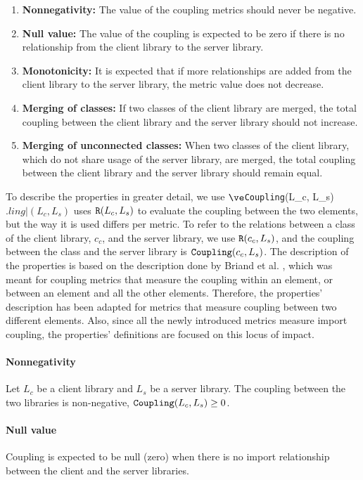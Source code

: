 \begin{enumerate}
  \item \textbf{Nonnegativity:} The value of the coupling metrics should never be negative.
  \item \textbf{Null value:} The value of the coupling is expected to be zero if there is no relationship from the client library to the server library.
  \item \textbf{Monotonicity:} It is expected that if more relationships are added from the client library to the server library, the metric value does not decrease.
  \item \textbf{Merging of classes:} If two classes of the client library are merged, the total coupling between the client library and the server library should not increase.
  \item \textbf{Merging of unconnected classes:} When two classes of the client library, which do not share usage of the server library, are merged, the total coupling between the client library and the server library should remain equal.
\end{enumerate}

To describe the properties in greater detail, we use $\ve$\verb|Coupling|(L_c, L_s)$.ling|(L_c, L_s)$ uses $\verb|R|(L_c, L_s)$ to evaluate the coupling between the two elements, but the way it is used differs per metric. To refer to the relations between a class of the client library, $c_c$, and the server library, we use $\verb|R|(c_c, L_s)$, and the coupling between the class and the server library is $\verb|Coupling|(c_c, L_s)$. The description of the properties is based on the description done by Briand et al. \cite{briand1996property}, which was meant for coupling metrics that measure the coupling within an element, or between an element and all the other elements. Therefore, the properties' description has been adapted for metrics that measure coupling between two different elements. Also, since all the newly introduced metrics measure import coupling, the properties' definitions are focused on this locus of impact.

\paragraph{Nonnegativity}

Let $L_c$ be a client library and $L_s$ be a server library. The coupling between the two libraries is non-negative, $\verb|Coupling|(L_c, L_s) \ge 0$.

\paragraph{Null value}
Coupling is expected to be null (zero) when there is no import relationship between the client and the server libraries.


